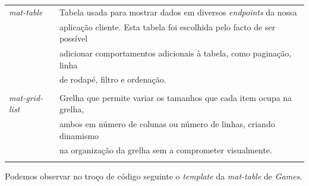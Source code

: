 \begin{tabular}{ll}
	\textit{mat-table} & Tabela usada para mostrar dados em diversos \textit{endpoints} da nossa \\
	&aplicação cliente. Esta tabela foi escolhida pelo facto de ser possível \\
	&adicionar comportamentos adicionais à tabela, como paginação, linha \\
	&de rodapé, filtro e ordenação. \\
	& \\
	\textit{mat-grid-list} & Grelha que permite variar os tamanhos que cada item ocupa na grelha,\\
	& ambos em número de colunas ou número de linhas, criando dinamismo \\
	&na organização da grelha sem a comprometer visualmente.\\
	& \\
\end{tabular}
Podemos observar no troço de código seguinte o \textit{template} da \textit{mat-table} de \textit{Games}.

